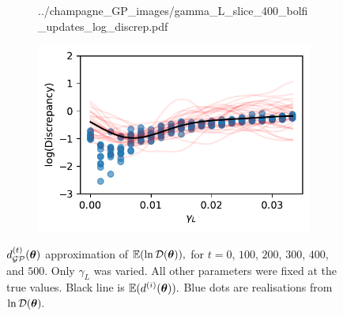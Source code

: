 \begin{figure}[htbp]
\begin{subfigure}[b]{0.5\textwidth}
{            ../champagne_GP_images/gamma_L_slice_400_bolfi_updates_log_discrep.pdf
        }
    \end{subfigure}%
    \hfill%
    \begin{subfigure}[b]{0.5\textwidth}
        \centering
        \includegraphics[width=\textwidth]{
            ../champagne_GP_images/gamma_L_slice_500_bolfi_updates_log_discrep.pdf
        }
    \end{subfigure}
    \caption{
        $d_{\mathcal{GP}}^{(t)}(\bm{\theta})$ approximation of $\operatorname{\mathbb{E}}(\ln\mathcal{D}(\bm{\theta})),$ 
        for $t= 0$, $100$, $200$, $300$, $400$, and $500.$ Only $\gamma_L$ was 
        varied. All other parameters were fixed at the true values. Black line 
        is
        $\operatorname{\mathbb{E}}(d^{(i)}(\bm{\theta})).$
        Blue dots are realisations from $\ln\mathcal{D}(\bm{\theta}).$
    }
\end{figure}

